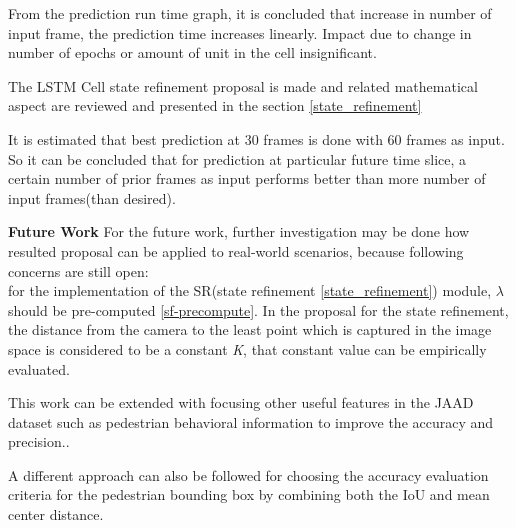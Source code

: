 From the prediction run time graph, it is concluded that increase in number of input frame, the prediction time increases linearly. Impact due to change in number of epochs or amount of unit in the cell insignificant.

The LSTM Cell state refinement proposal is made and related mathematical aspect are reviewed and presented in the section \ref{state_refinement}

It is estimated that best prediction at 30 frames is done with 60 frames as input. So it can be concluded that for prediction at particular future time slice, a certain number of prior frames as input performs better than more number of input frames(than desired).

\newpara

\textbf{Future Work}
For the future work, further investigation may be done how resulted proposal can be applied to real-world scenarios, because following concerns are still open: \\
for the implementation of the SR(state refinement \ref{state_refinement}) module, $\lambda$ should be pre-computed \ref{sf-precompute}. In the proposal for the state refinement, the distance from the camera to the least point which is captured in the image space is considered to be a constant \textit{K}, that constant value can be empirically evaluated.

This work can be extended with focusing other useful features in the JAAD dataset such as pedestrian behavioral information to improve the accuracy and precision..

A different approach can also be followed for choosing the accuracy evaluation criteria for the pedestrian bounding box by combining both the IoU and mean center distance.

